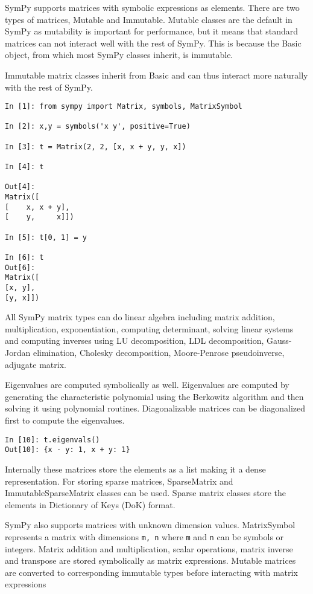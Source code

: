 

SymPy supports matrices with symbolic expressions as elements. There are two
types of matrices, Mutable and Immutable. Mutable classes are the default in
SymPy as mutability is important for performance, but it means that standard
matrices can not interact well with the rest of SymPy. This is because the
Basic object, from which most SymPy classes inherit, is immutable.

Immutable matrix classes inherit from Basic and can thus interact more
naturally with the rest of SymPy.

\begin{verbatim}
In [1]: from sympy import Matrix, symbols, MatrixSymbol

In [2]: x,y = symbols('x y', positive=True)

In [3]: t = Matrix(2, 2, [x, x + y, y, x])

In [4]: t

Out[4]:
Matrix([
[    x, x + y],
[    y,     x]])

In [5]: t[0, 1] = y

In [6]: t
Out[6]:
Matrix([
[x, y],
[y, x]])
\end{verbatim}

All SymPy matrix types can do linear algebra including matrix addition,
multiplication, exponentiation, computing determinant, solving linear
systems and computing inverses using LU decomposition, LDL decomposition,
Gauss-Jordan elimination, Cholesky decomposition, Moore-Penrose pseudoinverse,
adjugate matrix.

Eigenvalues are computed symbolically as well. Eigenvalues are computed by
generating the characteristic polynomial using the Berkowitz algorithm and
then solving it using polynomial routines. Diagonalizable matrices can be
diagonalized first to compute the eigenvalues.

\begin{verbatim}
In [10]: t.eigenvals()
Out[10]: {x - y: 1, x + y: 1}
\end{verbatim}

Internally these matrices store the elements as a list making it a dense
representation. For storing sparse matrices, SparseMatrix and 
ImmutableSparseMatrix classes can be used. Sparse matrix classes store
the elements in Dictionary of Keys (DoK) format.

SymPy also supports matrices with unknown dimension values. MatrixSymbol
represents a matrix with dimensions \verb|m, n| where \verb|m| and \verb|n|
can be symbols or integers. Matrix addition and multiplication, scalar
operations, matrix inverse and transpose are stored symbolically as
matrix expressions. Mutable matrices are converted to corresponding immutable
types before interacting with matrix expressions


